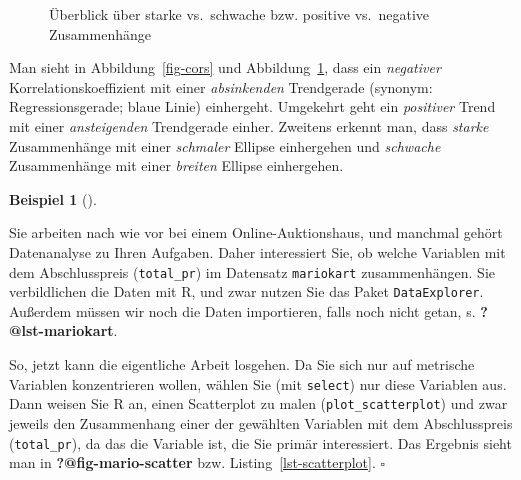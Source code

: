 \documentclass[
  letterpaper,
  oneside,
  open=any]{scrbook}
\theoremstyle{definition}
\theoremstyle{definition}
\newtheorem{example}{Beispiel}[chapter]
\theoremstyle{definition}
\theoremstyle{remark}
\begin{document}
\begin{figure}


\caption{\label{fig-cors2}Überblick über starke vs.~schwache bzw.
positive vs.~negative Zusammenhänge}

\end{figure}%

Man sieht in Abbildung~\ref{fig-cors} und Abbildung~\ref{fig-cors2},
dass ein \emph{negativer} Korrelationskoeffizient mit einer
\emph{absinkenden} Trendgerade (synonym: Regressionsgerade; blaue Linie)
einhergeht. Umgekehrt geht ein \emph{positiver} Trend mit einer
\emph{ansteigenden} Trendgerade einher. Zweitens erkennt man, dass
\emph{starke} Zusammenhänge mit einer \emph{schmaler} Ellipse
einhergehen und \emph{schwache} Zusammenhänge mit einer \emph{breiten}
Ellipse einhergehen.

\begin{example}[]\protect\hypertarget{exm-scatter}{}\label{exm-scatter}

Sie arbeiten nach wie vor bei einem Online-Auktionshaus, und manchmal
gehört Datenanalyse zu Ihren Aufgaben. Daher interessiert Sie, ob welche
Variablen mit dem Abschlusspreis (\texttt{total\_pr}) im Datensatz
\texttt{mariokart} zusammenhängen. Sie verbildlichen die Daten mit R,
und zwar nutzen Sie das Paket \texttt{DataExplorer}. Außerdem müssen wir
noch die Daten importieren, falls noch nicht getan, s.
\textbf{?@lst-mariokart}.

So, jetzt kann die eigentliche Arbeit losgehen. Da Sie sich nur auf
metrische Variablen konzentrieren wollen, wählen Sie (mit
\texttt{select}) nur diese Variablen aus. Dann weisen Sie R an, einen
Scatterplot zu malen (\texttt{plot\_scatterplot}) und zwar jeweils den
Zusammenhang einer der gewählten Variablen mit dem Abschlusspreis
(\texttt{total\_pr}), da das die Variable ist, die Sie primär
interessiert. Das Ergebnis sieht man in \textbf{?@fig-mario-scatter}
bzw. Listing~\ref{lst-scatterplot}. \(\square\)

\end{example}
\end{document}
